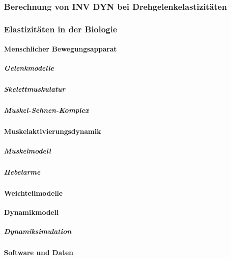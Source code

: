 \documentclass[a4paper, 11pt, accentcolor = tud3b]{tudreport}
\begin{document}
				\subsubsection{Berechnung von INV DYN bei Drehgelenkelastizitäten} %

				\subsubsection{Elastizitäten in der Biologie} %

					\paragraph{Menschlicher Bewegungsapparat} %

						\subparagraph{Gelenkmodelle} %

						\subparagraph{Skelettmuskulatur} %

						\subparagraph{Muskel-Sehnen-Komplex} %

					\paragraph{Muskelaktivierungsdynamik} %

						\subparagraph{Muskelmodell} %

						\subparagraph{Hebelarme} %

					\paragraph{Weichteilmodelle} %

					\paragraph{Dynamikmodell} %

						\subparagraph{Dynamiksimulation} %

					\paragraph{Software und Daten} %
\end{document}
